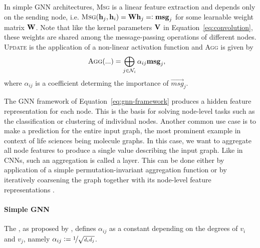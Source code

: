 \documentclass[
	fontsize=10pt, %
	twoside=true, %
	secnumdepth=1, %
  toc=indentunnumbered %
]{kaobook}
\begin{document}
In simple GNN architectures, \textsc{Msg} is a linear feature extraction and depends
only on the sending node, i.e. $\textsc{Msg}(\vec h_j, \vec h_i) = 
\mat W \vec h_j =: \msg_j$ for some learnable weight matrix $\mat W$. Note that
like the kernel parameters $\mat V$ in Equation~\ref{eq:convolution}, these weights are
shared among the message-passing operations of different nodes.
% 
\textsc{Update} is the application of a non-linear activation function and
\textsc{Agg} is given by
\begin{align*}
  & \textsc{Agg}(...) = \bigoplus_{j \in \mathcal{N}_i} \alpha_{ij} \vec{msg}_j,
\end{align*} where $\alpha_{ij}$ is a coefficient determing the importance of
$\vec{msg}_{j}$.


The GNN framework of Equation~\ref{eq:gnn-framework} produces a hidden feature representation
for each node. This is the basis for solving node-level tasks such as the
classification or clustering of individual nodes. Another common use case is to
make a prediction for the entire input graph, the most prominent example in
context of life sciences being molecule graphs. In this case, we want to
aggregate all node features to produce a single value describing the input
graph. Like in CNNs, such an aggregation is called a  layer. This
can be done either by application of a simple permutation-invariant aggregation
function or by iteratively coarsening the graph together with its node-level
feature representations \cite{ying_hierarchical_2019}. 


\paragraph{Simple GNN} The , as
proposed by \citeauthor{kipf_semi-supervised_2017}
\cite{kipf_semi-supervised_2017}, defines $\alpha_{ij}$ as a constant depending
on the degrees of $v_i$ and $v_j$, namely $\alpha_{ij} := \nicefrac{1}{\sqrt{d_i
    d_j}}$.
\end{document}
